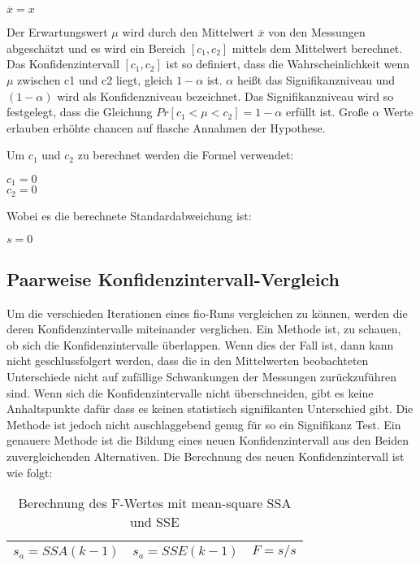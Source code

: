 \begin{center}
    $\overline{x} = x$
\end{center}

Der Erwartungswert $\mu$ wird durch den Mittelwert $\overline{x}$ von den Messungen abgeschätzt
und es wird ein Bereich $[c_1,c_2]$ mittels dem Mittelwert berechnet.
Das Konfidenzintervall $[c_1, c_2]$ ist so definiert, dass die Wahrscheinlichkeit
wenn $\mu$ zwischen c1 und c2 liegt, gleich $1 - \alpha$ ist. $\alpha$ heißt das
Signifikanzniveau und $(1 - \alpha)$ wird als Konfidenzniveau bezeichnet.
Das Signifikanzniveau wird so festgelegt, dass die Gleichung $Pr[c_1 < \mu < c_2] = 1 -\alpha$ erfüllt ist. 
Große $\alpha$ Werte erlauben erhöhte chancen auf flasche Annahmen der Hypothese. 

Um $c_1$ und $c_2$ zu berechnet werden die Formel verwendet:

\begin{center}
         $c_1 = 0$ \\
         $c_2 = 0$

\end{center}

Wobei es die berechnete Standardabweichung ist:

\begin{center}
         $s = 0$ 
\end{center}

\subsection{Paarweise Konfidenzintervall-Vergleich}

Um die verschieden Iterationen eines fio-Runs vergleichen zu können, werden die deren Konfidenzintervalle miteinander verglichen.
Ein Methode ist, zu schauen, ob sich die Konfidenzintervalle überlappen. Wenn dies der Fall ist, dann kann nicht
geschlussfolgert werden, dass die in den Mittelwerten beobachteten Unterschiede
nicht auf zufällige Schwankungen der Messungen zurückzuführen sind.
Wenn sich die Konfidenzintervalle nicht überschneiden, gibt es keine Anhaltspunkte dafür
dass es keinen statistisch signifikanten Unterschied gibt. Die Methode ist jedoch nicht auschlaggebend genug für so ein Signifikanz Test.
Ein genauere Methode ist die Bildung eines neuen Konfidenzintervall aus den Beiden zuvergleichenden Alternativen.
Die Berechnung des neuen Konfidenzintervall ist wie folgt:

\begin{center}
  \begin{table}[h!]
    \begin{tabularx}{\textwidth}{|X|X|X|}
      \hline
       $s_a = SSA ( k -1)$ & $s_a = SSE ( k -1)$ & $F = s/s$\\ 
      \hline
    \end{tabularx}
    \caption{Berechnung des F-Wertes mit mean-square SSA und SSE}
    \label{tab:two_Iteration_Konfidenzintervall}
  \end{table}
\end{center}

